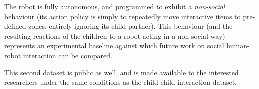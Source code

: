 \documentclass{article}
\begin{document}
The robot is fully autonomous, and programmed to exhibit a \emph{non-social}
behaviour (its action policy is simply to repeatedly move interactive items to
pre-defined zones, entirely ignoring its child partner).  This behaviour (and
the resulting reactions of the children to a robot acting in a non-social way)
represents an experimental baseline against which future work on social
human-robot interaction can be compared.

This second dataset is public as well, and is made available to the interested
researchers under the same conditions as the child-child interaction dataset.


%
%
%
%
%
%
\end{document}
